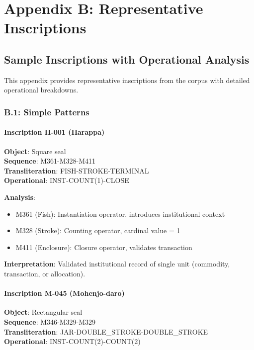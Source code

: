 \chapter*{Appendix B: Representative Inscriptions}

\section*{Sample Inscriptions with Operational Analysis}

This appendix provides representative inscriptions from the corpus with detailed operational breakdowns.

\subsection*{B.1: Simple Patterns}

\subsubsection*{Inscription H-001 (Harappa)}
\textbf{Object}: Square seal \\
\textbf{Sequence}: M361-M328-M411 \\
\textbf{Transliteration}: FISH-STROKE-TERMINAL \\
\textbf{Operational}: INST-COUNT(1)-CLOSE

\textbf{Analysis}:
\begin{itemize}
    \item M361 (Fish): Instantiation operator, introduces institutional context
    \item M328 (Stroke): Counting operator, cardinal value = 1
    \item M411 (Enclosure): Closure operator, validates transaction
\end{itemize}

\textbf{Interpretation}: Validated institutional record of single unit (commodity, transaction, or allocation).

\subsubsection*{Inscription M-045 (Mohenjo-daro)}
\textbf{Object}: Rectangular seal \\
\textbf{Sequence}: M346-M329-M329 \\
\textbf{Transliteration}: JAR-DOUBLE\_STROKE-DOUBLE\_STROKE \\
\textbf{Operational}: INST-COUNT(2)-COUNT(2)

